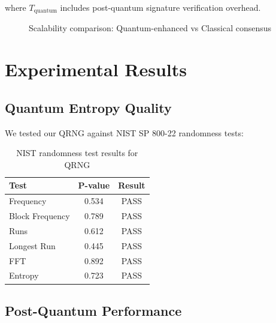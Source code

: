 \documentclass[11pt,a4paper]{article}
\begin{document}
where $T_{\text{quantum}}$ includes post-quantum signature verification overhead.

\begin{figure}[H]
\centering
{}
\caption{Scalability comparison: Quantum-enhanced vs Classical consensus}
\end{figure}

\section{Experimental Results}

\subsection{Quantum Entropy Quality}

We tested our QRNG against NIST SP 800-22 randomness tests:

\begin{table}[H]
\centering
\begin{tabular}{|l|c|c|}
\hline
\textbf{Test} & \textbf{P-value} & \textbf{Result} \\
\hline
Frequency & 0.534 & PASS \\
Block Frequency & 0.789 & PASS \\
Runs & 0.612 & PASS \\
Longest Run & 0.445 & PASS \\
FFT & 0.892 & PASS \\
Entropy & 0.723 & PASS \\
\hline
\end{tabular}
\caption{NIST randomness test results for QRNG}
\end{table}

\subsection{Post-Quantum Performance}
\end{document}
